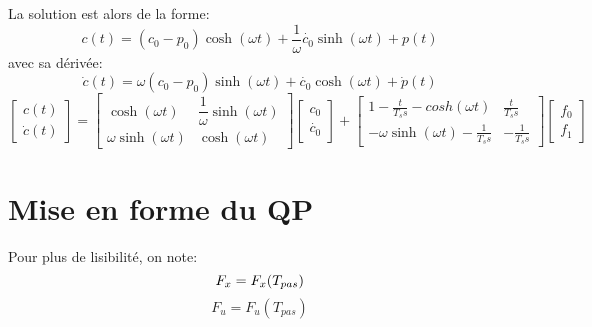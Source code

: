 \documentclass[10pt,a4paper]{article}
\begin{document}
La solution est alors de la forme:
\begin{equation}
c(t)=(c_0-p_0)\cosh(\omega t)+\dfrac{1}{\omega}\dot{c_0}\sinh(\omega t)+p(t)
\end{equation}
avec sa dérivée:
\begin{equation}
\dot{c}(t)=\omega(c_0-p_0)\sinh(\omega t)+\dot{c_0}\cosh(\omega t)+\dot{p}(t)
\end{equation}
\begin{equation}
\begin{bmatrix} 
c(t) \\
\dot{c}(t) 
\end{bmatrix} 
= 
\begin{bmatrix} 
\cosh(\omega t) 		&	 \dfrac{1}{\omega}\sinh(\omega t) \\
\omega\sinh(\omega t)	&	 \cosh(\omega t)
\end{bmatrix}
\begin{bmatrix} 
c_0 \\
\dot{c_0}
\end{bmatrix} 
+
\begin{bmatrix} 
1-\frac{t}{T_ss}-cosh(\omega t) 		  & \frac{t}{T_ss} \\
-\omega\sinh(\omega t)-	\frac{1}{T_ss} & -	\frac{1}{T_ss}
\end{bmatrix}
\begin{bmatrix} 
f_0 \\
f_1
\end{bmatrix}
\end{equation}
\section{Mise en forme du QP}
Pour plus de lisibilité, on note:
\begin{equation}
F_x=F_x(T_{pas})  \linebreak
\end{equation} 
\begin{equation}
F_u=F_u(T_{pas})
\end{equation} 
\end{document}
